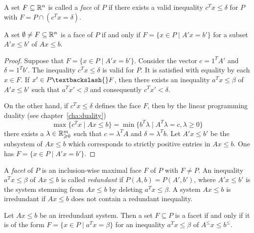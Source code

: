 A set $F\subseteq\mathbb{R}^n$ is called a \emph{face} of $P$ if there exists a
valid inequality $c^Tx\leq\delta$ for $P$ with $F = P \cap (c^Tx = \delta)$. 


\begin{lemma}
  \label{po:lem:4}
  A set $\emptyset \neq F \subseteq \mathbb{R}^n$ is a face of $P$
  if and only if $F = \{ x \in P \mid A'x = b'\}$ for a subset $A'x\leq b'$ of $Ax\leq b$.
\end{lemma}

\begin{proof}
  Suppose that $F = \{ x \in P \mid A'x = b'\}$. Consider the vector $c =
  1^TA'$ and $\delta = 1^Tb'$. The inequality $c^Tx\leq \delta$ is valid for
  $P$. It is satisfied with equality by each $x \in F$. If $x' \in P\textbackslash{}
  F$, then there exists an inequality $a^Tx\leq\beta$ of $A'x\leq b'$ such
  that $ a^Tx' < \beta$ and consequently $c^Tx'<\delta$. 

  On the other hand, if $c^Tx\leq\delta$ defines the face $F$,
  then by the linear programming duality (see chapter~\ref{cha:duality})
  \[ \max\{ c^Tx \mid Ax\leq b \} = \min\{ b^T\lambda \mid A^T\lambda = c, \lambda \geq 0 \} \]
  there exists a $\lambda \in \mathbb{R}^m_{\geqslant 0}$ such that $c=\lambda^TA$ and $\delta = \lambda^Tb$.
  Let $A'x\leq b'$ be the
  subsystem of $Ax\leq b$ which corresponds to strictly positive entries
  in $Ax\leq b$. One has $F = \{ x \in P \mid A'x = b'\}$. 
\end{proof}





A \emph{facet} of $P$ is an inclusion-wise maximal face $F$ of $P$
with $F\neq P$.  An inequality $a^Tx\leq\beta$ of $Ax\leq b$ is called
\emph{redundant} if $P(A,b) = P(A',b')$, where $A'x\leq b'$ is the system
stemming from $Ax\leq b$ by deleting $a^Tx\leq\beta$.  A system $Ax\leq b$ is
irredundant if $Ax\leq b$ does not contain a redundant inequality.

\begin{lemma}
  \label{po:lem:1}
  Let $Ax\leq b$ be an irredundant system. 
  Then a set $F\subseteq P$ is a facet if and only if it is
  of the form $F = \{ x \in P \mid a^Tx = \beta\}$ for an
  inequality $a^Tx\leq\beta$ of $A^\leq x\leq b^\leq$. 
\end{lemma}


